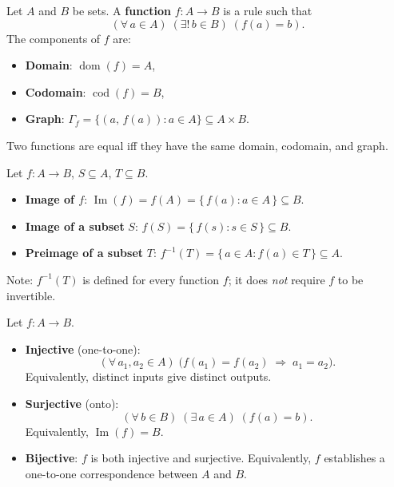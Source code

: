 \begin{definition}[Function]
\label{def:formal-model-theoretic-structures-l103}
  Let $A$ and $B$ be sets. A \textbf{function} $f : A \to B$ is a rule
  such that
  \[
    (\forall\, a \in A)\;(\exists!\, b \in B)\;(f(a) = b).
  \]
  The components of $f$ are:
  \begin{itemize}
    \item \textbf{Domain}: $\operatorname{dom}(f) = A$,
    \item \textbf{Codomain}: $\operatorname{cod}(f) = B$,
    \item \textbf{Graph}: $\Gamma_f = \{(a,\, f(a)) : a \in A\}
          \subseteq A \times B$.
  \end{itemize}
  Two functions are equal iff they have the same domain, codomain, and graph.
\end{definition}

\begin{definition}
\label{def:formal-model-theoretic-structures-l119}
  Let $f : A \to B$, $S \subseteq A$, $T \subseteq B$.
  \begin{itemize}
    \item \textbf{Image of $f$}:
      $\displaystyle\operatorname{Im}(f) = f(A) = \{\,f(a) : a \in A\,\}
       \subseteq B$.
    \item \textbf{Image of a subset} $S$:
      $\displaystyle f(S) = \{\,f(s) : s \in S\,\} \subseteq B$.
    \item \textbf{Preimage of a subset} $T$:
      $\displaystyle f^{-1}(T) = \{\,a \in A : f(a) \in T\,\} \subseteq A$.
  \end{itemize}
  Note: $f^{-1}(T)$ is defined for every function $f$; it does \emph{not}
  require $f$ to be invertible.
\end{definition}

\begin{definition}
\label{def:formal-model-theoretic-structures-l134}
  Let $f : A \to B$.
  \begin{itemize}
    \item \textbf{Injective} (one-to-one):
      \[
        (\forall\, a_1, a_2 \in A)\;
        \bigl(f(a_1) = f(a_2) \;\Rightarrow\; a_1 = a_2\bigr).
      \]
      Equivalently, distinct inputs give distinct outputs.
    \item \textbf{Surjective} (onto):
      \[
        (\forall\, b \in B)\;(\exists\, a \in A)\;(f(a) = b).
      \]
      Equivalently, $\operatorname{Im}(f) = B$.
    \item \textbf{Bijective}: $f$ is both injective and surjective.
      Equivalently, $f$ establishes a one-to-one correspondence between
      $A$ and $B$.
  \end{itemize}
\end{definition}

